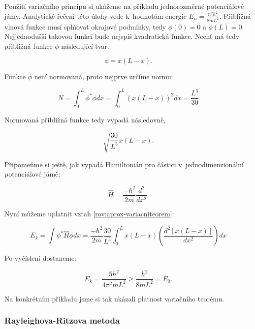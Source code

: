\begin{priklad}
 Použití variačního principu si ukážeme na příkladu jednorozměrné potenciálové jámy. Analytické řečení této úlohy vede k~hodnotám energie $ E_n=\frac{n^2h^2}{8mL^2}$. Přibližná vlnová funkce musí splňovat okrajové podmínky, tedy $ \phi(0)=0 $ a $ \phi(L)=0 $. Nejjednodušší takovou funkcí bude nejspíš kvadratická funkce. Nechť má tedy přibližná funkce $\phi$ následující tvar:
 
\begin{displaymath} 
\phi=x(L-x).
\end{displaymath}
 
Funkce $\phi$ není normovaná, proto nejprve určíme normu:
 
\begin{displaymath} 
N=\int_0^L \phi^*\phi dx=\int_0^L (x(L-x))^2 dx=\frac{L^5}{30} 
\end{displaymath}
 
 Normovaná přibližná funkce tedy vypadá následovně,
 
\begin{displaymath} 
\sqrt{\frac{30}{L^5}} x(L-x).
\end{displaymath}
 
 Připomeňme si ještě, jak vypadá Hamiltonián pro částici v~jednodimenzionální potenciálové jámě:
 
   \begin{displaymath} 
\hat{H}=\frac{-\hbar^2}{2m}\frac{d^2}{d x^2}.
\end{displaymath}
 
Nyní můžeme uplatnit vztah \ref{rov:aprox-variacniteorem}:

   \begin{displaymath} 
E_k=\int\phi^*\hat{H}\phi dx=\frac{-\hbar^2}{2m}\frac{30}{L^5}\int_0^L x(L-x)\left(\frac{d^2 [x(L-x)]}{d x^2}\right)dx
\end{displaymath}
 
 Po vyčíslení dostaneme:
 
    \begin{displaymath} 
E_k=\frac{5h^2}{4\pi^2 mL^2}\geq \frac{h^2}{8mL^2}=E_0.    
\end{displaymath}
 
Na konkrétním příkladu jsme si tak ukázali platnost variačního teorému. 
 \end{priklad}
 
 \subsubsection{Rayleighova-Ritzova metoda}
 
